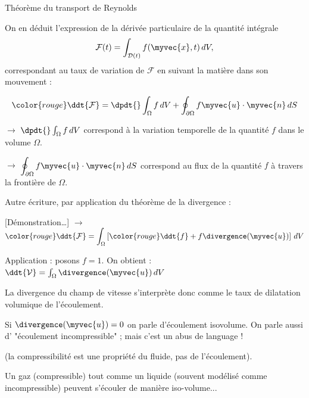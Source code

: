 \begin{frame}{Théorème du transport de Reynolds}

\small

On en déduit l'expression de la dérivée particulaire de la quantité intégrale 
\[
	\mathcal{F}(t) = \int_{{\cal D}(t)} f(\myvec{x}, t)\, dV,
\]
correspondant au taux de variation de $\mathcal{F}$ en suivant la matière dans son mouvement :

\[
	\color{rouge}
	\ddt{\mathcal{F}} 
	= 
	\dpdt{} \int_\Omega f\, dV + \oint_{\partial\Omega} f\myvec{u}\cdot\myvec{n}\, dS
\]

$\longrightarrow$ $\dpdt{} \int_\Omega f\, dV$ correspond à la variation temporelle de la quantité $f$
dans le volume $\Omega$.

\smallskip

$\longrightarrow$ $\displaystyle \oint_{\partial\Omega} f\myvec{u}\cdot\myvec{n}\, dS$ correspond au \textcolor{rouge}{flux}
de la quantité $f$ à travers la frontière de $\Omega$.

\pause
\bigskip

Autre écriture, par application du \textcolor{vert}{théorème de la divergence} :

\medskip
\pause

[Démonstration\ldots] \qquad $\longrightarrow$ \qquad
$ \displaystyle \color{rouge}	
\ddt{\mathcal{F}} = 
\int_\Omega \left [{\color{rouge}\ddt{f}} + f\divergence (\myvec{u})\right ] \, dV
$

\medskip
\pause 

Application : posons $f=1$. On obtient :
\smallskip
$	
\ddt{\mathcal{V}} = 
\int_\Omega  \divergence (\myvec{u})  \, dV
$

\smallskip
La divergence du champ de vitesse s'interprète donc comme le taux de dilatation volumique de l'écoulement.

Si $\divergence (\myvec{u}) = 0$ on parle d'écoulement isovolume.
On parle aussi d' "écoulement incompressible" ; mais c'est un abus de language ! 

(la compressibilité est une propriété du fluide, pas de l'écoulement). 

Un gaz (compressible) tout comme un liquide (souvent modélisé comme incompressible) peuvent s'écouler de manière iso-volume...



\end{frame}


